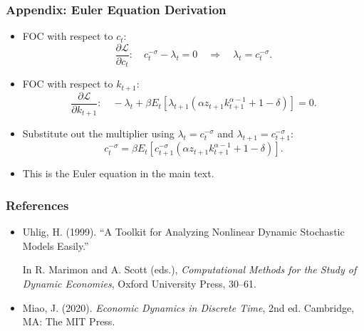 \documentclass{beamer}
\newcommand{\backupend}{
   \addtocounter{framenumbervorappendix}{-\value{framenumber}}
   \addtocounter{framenumber}{\value{framenumbervorappendix}}
}
\begin{document}
\begin{frame}
\frametitle{Appendix: Euler Equation Derivation}

\begin{itemize}
	\item FOC with respect to $c_t$:
	\begin{equation*}
	\frac{\partial \mathcal{L}}{\partial c_{t}}:\quad c_{t}^{-\sigma }-\lambda _{t}=0
	\quad \Rightarrow \quad \lambda _{t}=c_{t}^{-\sigma }.
	\end{equation*}

	\item FOC with respect to $k_{t+1}$:
	\begin{equation*}
	\frac{\partial \mathcal{L}}{\partial k_{t+1}}:\quad -\lambda _{t}+\beta E_t\left[ \lambda _{t+1}\left( \alpha z_{t+1}k_{t+1}^{\alpha -1}+1-\delta \right) \right] =0.
	\end{equation*}

	\item Substitute out the multiplier using $\lambda _{t}=c_{t}^{-\sigma }$ and $\lambda _{t+1}=c_{t+1}^{-\sigma }$:
	\begin{equation*}
	c_{t}^{-\sigma }=\beta E_t\left[ c_{t+1}^{-\sigma }\left(
	\alpha z_{t+1}k_{t+1}^{\alpha -1}+1-\delta \right) \right] .
	\end{equation*}

	\item This is the Euler equation in the main text.
	\hyperlink{euler-main}{}
\end{itemize}
\end{frame}

\backupend


\begin{frame}
\frametitle{References}

\small

\begin{itemize}
	\item \hypertarget{ref:uhlig}{Uhlig, H. (1999). ``A Toolkit for Analyzing Nonlinear Dynamic Stochastic Models Easily.''} In R. Marimon and A. Scott (eds.), \textit{Computational Methods for the Study of Dynamic Economies}, Oxford University Press, 30--61.
	
	\item Miao, J. (2020). \textit{Economic Dynamics in Discrete Time}, 2nd ed. Cambridge, MA: The MIT Press.
\end{itemize}


\end{frame}
\end{document}
